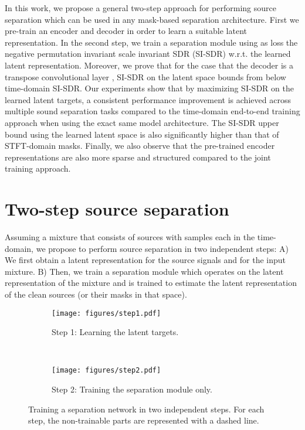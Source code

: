 \documentclass{article}
\begin{document}
In this work, we propose a general two-step approach for performing source separation which can be used in any mask-based separation architecture. First we pre-train an encoder and decoder in order to learn a suitable latent representation. In the second step, we train a separation module using as loss the negative permutation invariant \cite{Yu2017PIT} scale invariant SDR (SI-SDR) \cite{le2019sdr} w.r.t. the learned latent representation. Moreover, we prove that for the case that the decoder is a transpose convolutional layer \cite{luo2019convTasNet, kavalerov2019universal}, SI-SDR on the latent space bounds from below time-domain SI-SDR. Our experiments show that by maximizing SI-SDR on the learned latent targets, a consistent performance improvement is achieved across multiple sound separation tasks compared to the time-domain end-to-end training approach when using the exact same model architecture. The SI-SDR upper bound using the learned latent space is also significantly higher than that of STFT-domain masks. Finally, we also observe that the pre-trained encoder representations are also more sparse and structured compared to the joint training approach. 

\section{Two-step source separation}
\label{sec:method}
Assuming a mixture  that consists of  sources  with  samples each in the time-domain, we propose to perform source separation in two independent steps: A) We first obtain a latent representation  for the source signals and  for the input mixture. B) Then, we train a separation module which operates on the latent representation of the mixture  and is trained to estimate the latent representation of the clean sources  (or their masks  in that space).
\begin{figure}[!htb]
    \centering
  \begin{subfigure}[h]{\linewidth}
      \texttt{[image: figures/step1.pdf]}
      \caption{Step 1: Learning the latent targets.}
      \label{fig:step1}
  \end{subfigure} \\
  \begin{subfigure}[h]{\linewidth}
      \texttt{[image: figures/step2.pdf]}
      \caption{Step 2: Training the separation module only.}
      \label{fig:step2}
  \end{subfigure} 
    \caption{Training a separation network in two independent steps. For each step, the non-trainable parts are represented with a dashed line.}
    \label{fig:twosteps}
\end{figure} 
\end{document}
